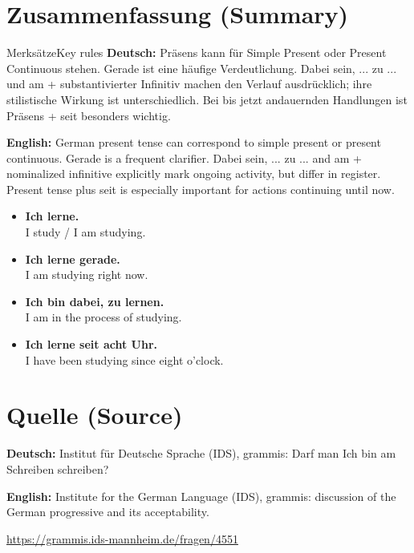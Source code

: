 \documentclass[a4paper,11pt]{article}
\newcommand{\GermanText}[1]{\textbf{Deutsch: }#1\par}
\newcommand{\EnglishText}[1]{{\small\color{SoftGray}\textbf{English: }#1\par}}
\newcommand{\ExampleItem}[2]{\item \textbf{#1}\\{\small\color{SoftGray}#2}}
\begin{document}
\section{Zusammenfassung \textnormal{(Summary)}}
\begin{grammarentry}{Merksätze}{Key rules}
\GermanText{Präsens kann für Simple Present oder Present Continuous stehen. Gerade ist eine häufige Verdeutlichung. Dabei sein, ... zu ... und am + substantivierter Infinitiv machen den Verlauf ausdrücklich; ihre stilistische Wirkung ist unterschiedlich. Bei bis jetzt andauernden Handlungen ist Präsens + seit besonders wichtig.}
\EnglishText{German present tense can correspond to simple present or present continuous. Gerade is a frequent clarifier. Dabei sein, ... zu ... and am + nominalized infinitive explicitly mark ongoing activity, but differ in register. Present tense plus seit is especially important for actions continuing until now.}
\end{grammarentry}
\begin{exbox}
\begin{itemize}
\ExampleItem{Ich lerne.}{I study / I am studying.}
\ExampleItem{Ich lerne gerade.}{I am studying right now.}
\ExampleItem{Ich bin dabei, zu lernen.}{I am in the process of studying.}
\ExampleItem{Ich lerne seit acht Uhr.}{I have been studying since eight o'clock.}
\end{itemize}
\end{exbox}

\section{Quelle \textnormal{(Source)}}
\GermanText{Institut für Deutsche Sprache (IDS), grammis: Darf man Ich bin am Schreiben schreiben?}
\EnglishText{Institute for the German Language (IDS), grammis: discussion of the German progressive and its acceptability.}
\url{https://grammis.ids-mannheim.de/fragen/4551}
\end{document}
